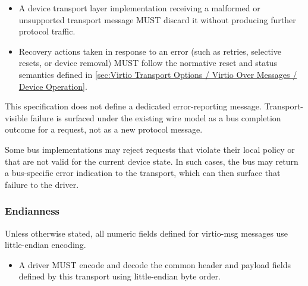 \begin{itemize}
  \item A device transport layer implementation receiving a malformed or
        unsupported transport message MUST discard it without producing further
        protocol traffic.
  \item Recovery actions taken in response to an error (such as retries,
        selective resets, or device removal) MUST follow the normative reset and
        status semantics defined in
        \ref{sec:Virtio Transport Options / Virtio Over Messages / Device Operation}.
\end{itemize}

This specification does not define a dedicated error-reporting message.
Transport-visible failure is surfaced under the existing wire model as a bus
completion outcome for a request, not as a new protocol message.

Some bus implementations may reject requests that violate their local policy
or that are not valid for the current device state. In such cases, the bus may
return a bus-specific error indication to the transport, which can then surface
that failure to the driver.

\subsubsection{Endianness}
\label{sec:Virtio Transport Options / Virtio Over Messages / Basic Concepts / Endianness}

Unless otherwise stated, all numeric fields defined for virtio-msg messages use
little-endian encoding.

\begin{itemize}
  \item A driver MUST encode and decode the common header and payload fields
        defined by this transport using little-endian byte order.
\end{itemize}

